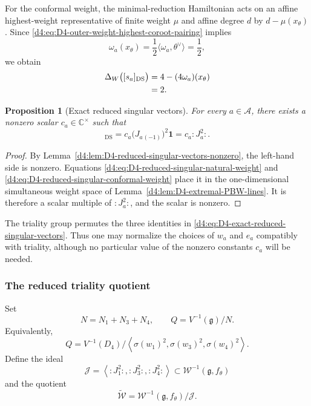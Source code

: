\documentclass[11pt,reqno]{amsart}
\newtheorem{proposition}[theorem]{Proposition}
\theoremstyle{definition}
\theoremstyle{remark}
\begin{document}
For the conformal weight, the minimal-reduction Hamiltonian acts on an
affine highest-weight representative of finite weight \(\mu\) and
affine degree \(d\) by \(d-\mu(x_\theta)\).  Since
\eqref{d4:eq:D4-outer-weight-highest-coroot-pairing} implies
\begin{equation*}
  \omega_a(x_\theta)
  =\frac12\langle\omega_a,\theta^\vee\rangle
  =\frac12,
\end{equation*}
we obtain
\begin{align}
  \Delta_W\bigl([s_a]_{\mathrm{DS}}\bigr)
  &=4-(4\omega_a)(x_\theta)
    \notag\\
  &=2.
  \label{d4:eq:D4-reduced-singular-conformal-weight}
\end{align}

\begin{proposition}[Exact reduced singular vectors]
\label{d4:prop:D4-exact-reduced-singular-vectors}
For every \(a\in\mathcal A\), there exists a nonzero scalar
\(c_a\in\mathbb C^\times\) such that
\begin{equation}
  [s_a]_{\mathrm{DS}}
  =c_a\bigl(J_a{}_{(-1)}\bigr)^2\mathbf1
  =c_a:J_a^2:.
  \label{d4:eq:D4-exact-reduced-singular-vectors}
\end{equation}
\end{proposition}

\begin{proof}
By Lemma~\ref{d4:lem:D4-reduced-singular-vectors-nonzero}, the left-hand
side is nonzero.  Equations
\eqref{d4:eq:D4-reduced-singular-natural-weight} and
\eqref{d4:eq:D4-reduced-singular-conformal-weight} place it in the
one-dimensional simultaneous weight space of
Lemma~\ref{d4:lem:D4-extremal-PBW-lines}.  It is therefore a scalar multiple
of \(:J_a^2:\), and the scalar is nonzero.
\end{proof}

The triality group permutes the three identities in
\eqref{d4:eq:D4-exact-reduced-singular-vectors}.  Thus one may normalize the
choices of \(w_a\) and \(e_a\) compatibly with triality, although no
particular value of the nonzero constants \(c_a\) will be needed.

\subsubsection{The reduced triality quotient}


Set
\begin{equation*}
  N=N_1+N_3+N_4,
  \qquad
  Q=V^{-1}(\mathfrak g)/N.
\end{equation*}
Equivalently,
\begin{equation*}
  Q
  =V^{-1}(D_4)
   \Big/
   \left\langle
     \sigma(w_1)^2,
     \sigma(w_3)^2,
     \sigma(w_4)^2
   \right\rangle.
\end{equation*}
Define the ideal
\begin{equation*}
  \mathcal J
  =\left\langle
     :J_1^2:,
     :J_3^2:,
     :J_4^2:
   \right\rangle
  \subset\mathcal W^{-1}(\mathfrak g,f_\theta)
\end{equation*}
and the quotient
\begin{equation*}
  \widetilde{\mathcal W}
  =\mathcal W^{-1}(\mathfrak g,f_\theta)/\mathcal J.
\end{equation*}
\end{document}
